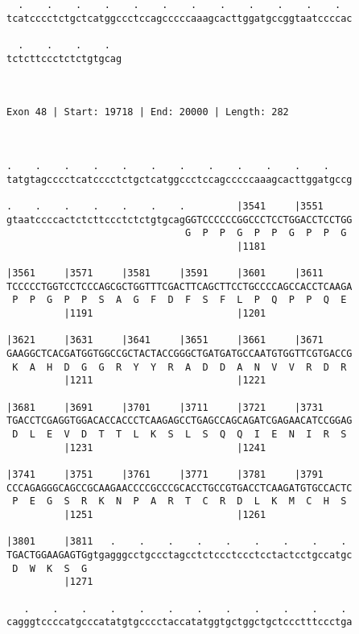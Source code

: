 \documentclass{article}
\begin{document}
\begin{Verbatim}
  .    .    .    .    .    .    .    .    .    .    .    .  
tcatcccctctgctcatggccctccagcccccaaagcacttggatgccggtaatccccac
                                                            
  .    .    .    .  
tctcttccctctctgtgcag
                    
                    
 
Exon 48 | Start: 19718 | End: 20000 | Length: 282



.    .    .    .    .    .    .    .    .    .    .    .    
tatgtagcccctcatcccctctgctcatggccctccagcccccaaagcacttggatgccg
                                                            
.    .    .    .    .    .    .         |3541     |3551     
gtaatccccactctcttccctctctgtgcagGGTCCCCCCGGCCCTCCTGGACCTCCTGG
                               G  P  P  G  P  P  G  P  P  G 
                                        |1181               
  
|3561     |3571     |3581     |3591     |3601     |3611     
TCCCCCTGGTCCTCCCAGCGCTGGTTTCGACTTCAGCTTCCTGCCCCAGCCACCTCAAGA
 P  P  G  P  P  S  A  G  F  D  F  S  F  L  P  Q  P  P  Q  E 
          |1191                         |1201               
  
|3621     |3631     |3641     |3651     |3661     |3671     
GAAGGCTCACGATGGTGGCCGCTACTACCGGGCTGATGATGCCAATGTGGTTCGTGACCG
 K  A  H  D  G  G  R  Y  Y  R  A  D  D  A  N  V  V  R  D  R 
          |1211                         |1221               
  
|3681     |3691     |3701     |3711     |3721     |3731     
TGACCTCGAGGTGGACACCACCCTCAAGAGCCTGAGCCAGCAGATCGAGAACATCCGGAG
 D  L  E  V  D  T  T  L  K  S  L  S  Q  Q  I  E  N  I  R  S 
          |1231                         |1241               
  
|3741     |3751     |3761     |3771     |3781     |3791     
CCCAGAGGGCAGCCGCAAGAACCCCGCCCGCACCTGCCGTGACCTCAAGATGTGCCACTC
 P  E  G  S  R  K  N  P  A  R  T  C  R  D  L  K  M  C  H  S 
          |1251                         |1261               
  
|3801     |3811   .    .    .    .    .    .    .    .    . 
TGACTGGAAGAGTGgtgagggcctgccctagcctctccctccctcctactcctgccatgc
 D  W  K  S  G                                              
          |1271                                             
  
   .    .    .    .    .    .    .    .    .    .    .    . 
cagggtccccatgcccatatgtgcccctaccatatggtgctggctgctccctttccctga
                                                            

\end{Verbatim}
\end{document}
